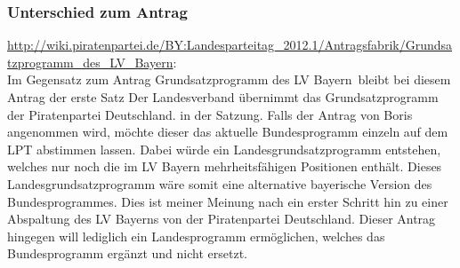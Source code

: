 \subsubsection{Unterschied zum Antrag}
\url{http://wiki.piratenpartei.de/BY:Landesparteitag_2012.1/Antragsfabrik/Grundsatzprogramm_des_LV_Bayern}:\\
Im Gegensatz zum Antrag \glqq Grundsatzprogramm des LV Bayern\grqq\  bleibt bei diesem Antrag der
erste Satz {\quote Der Landesverband übernimmt das Grundsatzprogramm der Piratenpartei
Deutschland.}  in der Satzung. Falls der Antrag von Boris angenommen wird, möchte dieser das
aktuelle Bundesprogramm einzeln auf dem LPT abstimmen lassen. Dabei würde ein
Landesgrundsatzprogramm entstehen, welches nur noch die im LV Bayern mehrheitsfähigen
Positionen enthält. Dieses Landesgrundsatzprogramm wäre somit eine alternative bayerische
Version des Bundesprogrammes. Dies ist meiner Meinung nach ein erster Schritt hin zu einer
Abspaltung des LV Bayerns von der Piratenpartei Deutschland. Dieser Antrag hingegen will
lediglich ein Landesprogramm ermöglichen, welches das Bundesprogramm ergänzt und nicht
ersetzt.
